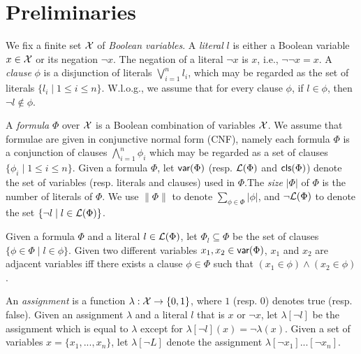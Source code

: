 \section{Preliminaries}\label{sec:prel}

We fix a finite set  $\mathcal{X}$ of \emph{Boolean variables}.
A \emph{literal} $l$ is either a Boolean variable $x\in \mathcal{X}$ or its negation $\neg x$.
The negation of a literal $\neg x$ is $x$, i.e., $\neg\neg x=x$.
A \emph{clause} $\phi$ is a disjunction of literals $\bigvee_{i=1}^n l_i$, which may be regarded as
the set of literals $\{l_i\mid 1\leq i\leq n\}$. W.l.o.g., we assume that for every
clause $\phi$, if $l\in\phi$, then $\neg l\not\in \phi$.

A \emph{formula} $\Phi$ over $\mathcal{X}$ is a Boolean combination of variables $\mathcal{X}$.
We assume that formulae are given in conjunctive normal
form (CNF), namely each formula $\Phi$ is a conjunction of clauses $\bigwedge_{i=1}^n\phi_i$ which may be regarded as a set of clauses $\{\phi_i\mid 1\leq i\leq n\}$. Given a formula $\Phi$, let $\textsf{var}(\Phi)$ (resp. $\Lit(\Phi)$  and $\textsf{cls}(\Phi)$) denote the set of variables (resp. literals and clauses) used in $\Phi$.The \emph{size} $|\Phi|$ of $\Phi$ is the number of literals of $\Phi$.
We use $\|\Phi\|$ to denote $\sum_{\phi\in\Phi}|\phi|$, and $\neg\Lit(\Phi)$ to denote the set $\{\neg l \mid l\in \Lit(\Phi)\}$.

Given a formula $\Phi$ and a literal $l\in\Lit(\Phi)$,
let $\Phi_{l}\subseteq \Phi$ be the set of clauses $\{\phi\in\Phi\mid l\in\phi\}$.
Given two different variables $x_1, x_2\in\textsf{var}(\Phi)$, $x_1$ and $x_2$ are adjacent variables iff there exists a clause $\phi\in\Phi$ such that $(x_1\in\phi)\wedge(x_2\in\phi)$.


An \emph{assignment} is a function $\lambda: \mathcal{X} \rightarrow \{0,1\}$, where $1$ (resp. $0$) denotes true (resp. false).
Given an assignment $\lambda$ and a literal $l$ that is $x$ or $\neg x$, let $\lambda[\neg l]$ be the assignment which is equal to $\lambda$
except for $\lambda[\neg l](x)=\neg \lambda(x)$. Given a set of variables $x=\{x_1,...,x_n\}$, let $\lambda[\neg L]$ denote the assignment
$\lambda[\neg x_1]...[\neg x_n]$.


